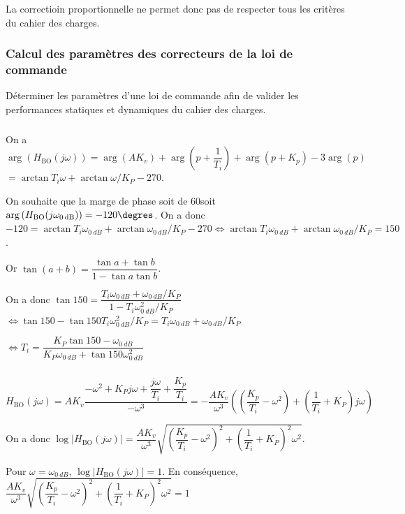 \documentclass[10pt,fleqn]{article} %
\begin{document}
La correctioin proportionnelle ne permet donc pas de respecter tous les critères du cahier des charges.

\subsubsection{Calcul des paramètres des correcteurs de la loi de commande}

\begin{obj}
Déterminer les paramètres d’une loi de commande afin de valider les performances statiques et dynamiques du cahier des charges.
\end{obj}

\subparagraph{}
On a $\arg \left(H_{\text{BO}}(j\omega)\right)=\arg\left(AK_v \right) + \arg\left(p+\dfrac{1}{T_i}\right) + \arg\left(p+K_p\right)-3 \arg(p)$
$ =\arctan T_i\omega +\arctan\omega/K_P -270$.

On souhaite que la marge de phase soit de 60\degres soit 
$\arg \left(H_{\text{BO}}(j\omega_{\SI{0}{dB}})\right)=-120\degres$. 
On a donc 
$-120=\arctan T_i\omega_{\SI{0}{dB}} +\arctan\omega_{\SI{0}{dB}}/K_P -270 \Leftrightarrow \arctan T_i\omega_{\SI{0}{dB}} +\arctan\omega_{\SI{0}{dB}}/K_P = 150$.

Or $\tan(a+b)=\dfrac{\tan a + \tan b}{1-\tan a\tan b}$. 

On a donc $\tan 150 = \dfrac{T_i\omega_{\SI{0}{dB}} + \omega_{\SI{0}{dB}}/K_P}{1-T_i\omega_{\SI{0}{dB}}^2/K_P}$
$ \Leftrightarrow \tan 150 -\tan 150 T_i\omega_{\SI{0}{dB}}^2/K_P= T_i\omega_{\SI{0}{dB}} + \omega_{\SI{0}{dB}}/K_P $

$ \Leftrightarrow  T_i  = \dfrac{K_P\tan 150 - \omega_{\SI{0}{dB}}}{K_P\omega_{\SI{0}{dB}}+\tan 150 \omega_{\SI{0}{dB}}^2}$


\subparagraph{}

$H_{\text{BO}}(j\omega)=AK_v\dfrac{-\omega^2 + K_Pj\omega + \dfrac{j\omega}{T_i}+\dfrac{K_p}{T_i }}{-\omega^3}
=-\dfrac{AK_v}{\omega^3}  \left(\left(\dfrac{K_p}{T_i }-\omega^2 \right)+\left(\dfrac{1}{T_i}+ K_P\right)j\omega \right)$

On a donc 
$\log\left|H_{\text{BO}}(j\omega)\right|=\dfrac{AK_v}{\omega^3}  \sqrt{\left(\dfrac{K_p}{T_i }-\omega^2 \right)^2+\left(\dfrac{1}{T_i}+ K_P\right)^2\omega^2}$. 

Pour $\omega=\omega_{\SI{0}{dB}}$, $\log\left|H_{\text{BO}}(j\omega)\right|=1$. En conséquence, 
$\dfrac{AK_v}{\omega^3}  \sqrt{\left(\dfrac{K_p}{T_i }-\omega^2 \right)^2+\left(\dfrac{1}{T_i}+ K_P\right)^2\omega^2}=1 $
\end{document}
